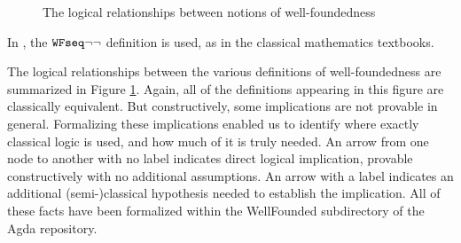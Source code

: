 \begin{figure}[hb]
\caption{The logical relationships between notions of well-foundedness}
 \label{fig:WF} 
\end{figure}
\clearpage

In \cite{Terese}, the $\mathtt{WFseq}{\lnot\lnot}$ definition is used, as in the classical mathematics textbooks.

The logical relationships between the various definitions of well-foundedness are summarized in 
Figure \ref{fig:WF}.
Again, all of the definitions appearing in this figure are classically equivalent.
But constructively, some implications are not provable in general.
Formalizing these implications enabled us to identify where exactly classical logic 
is used, and how much of it is truly needed.
An arrow from one node to another with no label indicates direct logical implication,
provable constructively with no additional assumptions. An arrow with a label indicates an additional 
(semi-)classical hypothesis needed to establish the implication. All of these facts have been 
formalized within the WellFounded subdirectory of the Agda repository.

